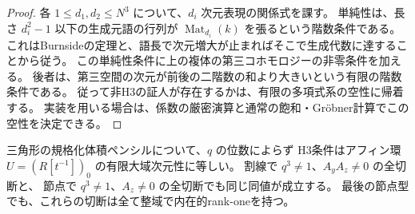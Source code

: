 \begin{proof}
各 $1\le d_1,d_2\le N^3$ について、$d_i$ 次元表現の関係式を課す。
単純性は、長さ $d_i^2-1$ 以下の生成元語の行列が
$\operatorname{Mat}_{d_i}(k)$ を張るという階数条件である。
これはBurnsideの定理と、語長で次元増大が止まればそこで生成代数に達することから従う。
この単純性条件に上の複体の第三コホモロジーの非零条件を加える。
後者は、第三空間の次元が前後の二階数の和より大きいという有限の階数条件である。
従って非H3の証人が存在するかは、有限の多項式系の空性に帰着する。
実装を用いる場合は、係数の厳密演算と通常の飽和・Gr\"obner計算でこの空性を決定できる。
\end{proof}

\begin{theorem}\label{thm:cubic-CY-three-alpha-quantum-boundary-all-q}
三角形の規格化体積ペンシルについて、$q$ の位数によらず
H3条件はアフィン環 $U=(R[t^{-1}])_0$ の有限大域次元性に等しい。
割線で $q^3\ne1$、$A_yA_z\ne0$ の全切断と、
節点で $q^3\ne1$、$A_z\ne0$ の全切断でも同じ同値が成立する。
最後の節点型でも、これらの切断は全て整域で内在的rank-oneを持つ。
\end{theorem}

